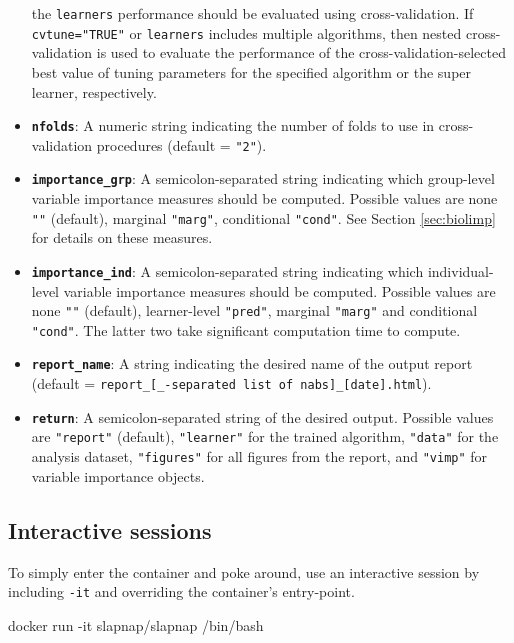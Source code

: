 \documentclass[]{article}
\newenvironment{Shaded}{\begin{snugshade}}{\end{snugshade}}
\newcommand{\ExtensionTok}[1]{#1}
\newcommand{\NormalTok}[1]{#1}
\begin{document}
\begin{itemize}
  the \texttt{learners} performance should be evaluated using
  cross-validation. If \texttt{cvtune="TRUE"} or \texttt{learners}
  includes multiple algorithms, then nested cross-validation is used to
  evaluate the performance of the cross-validation-selected best value
  of tuning parameters for the specified algorithm or the super learner,
  respectively.
\item
  \textbf{\texttt{nfolds}}: A numeric string indicating the number of
  folds to use in cross-validation procedures (default = \texttt{"2"}).
\item
  \textbf{\texttt{importance\_grp}}: A semicolon-separated string
  indicating which group-level variable importance measures should be
  computed. Possible values are none \texttt{""} (default), marginal
  \texttt{"marg"}, conditional \texttt{"cond"}. See Section
  \ref{sec:biolimp} for details on these measures.
\item
  \textbf{\texttt{importance\_ind}}: A semicolon-separated string
  indicating which individual-level variable importance measures should
  be computed. Possible values are none \texttt{""} (default),
  learner-level \texttt{"pred"}, marginal \texttt{"marg"} and
  conditional \texttt{"cond"}. The latter two take significant
  computation time to compute.
\item
  \textbf{\texttt{report\_name}}: A string indicating the desired name
  of the output report (default =
  \texttt{report\_{[}\_-separated\ list\ of\ nabs{]}\_{[}date{]}.html}).
\item
  \textbf{\texttt{return}}: A semicolon-separated string of the desired
  output. Possible values are \texttt{"report"} (default),
  \texttt{"learner"} for the trained algorithm, \texttt{"data"} for the
  analysis dataset, \texttt{"figures"} for all figures from the report,
  and \texttt{"vimp"} for variable importance objects.
\end{itemize}

\subsection{Interactive sessions}\label{interactive-sessions}

To simply enter the container and poke around, use an interactive
session by including \texttt{-it} and overriding the container's
entry-point.

\begin{Shaded}
\begin{Highlighting}[]
\ExtensionTok{docker}\NormalTok{ run -it slapnap/slapnap /bin/bash}
\end{Highlighting}
\end{Shaded}
\end{document}
